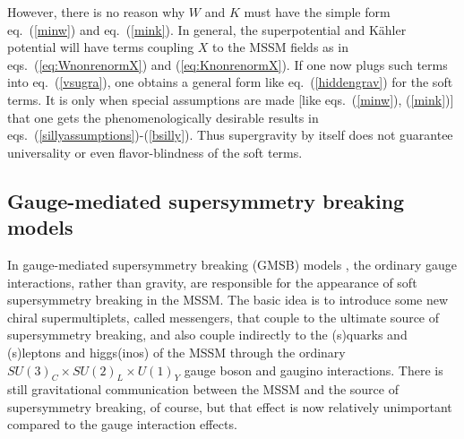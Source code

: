 \documentclass[12pt]{article}
\begin{document}
However, there is no  reason why $W$ and $K$ must have the 
simple form eq.~(\ref{minw}) and eq.~(\ref{mink}). In general, the 
superpotential and K\"ahler potential will have terms coupling $X$ to the MSSM 
fields as in eqs.~(\ref{eq:WnonrenormX}) and (\ref{eq:KnonrenormX}).
If one now plugs such terms into eq.~(\ref{vsugra}), one obtains a
general form like eq.~(\ref{hiddengrav}) for the soft terms. It is only
when special assumptions are made [like eqs.~(\ref{minw}), (\ref{mink})]
that one gets the phenomenologically desirable results in
eqs.~(\ref{sillyassumptions})-(\ref{bsilly}). Thus
supergravity by itself does not guarantee universality or 
even flavor-blindness of the soft
terms. 


\subsection{Gauge-mediated supersymmetry breaking
models}\label{subsec:origins.gmsb}
\setcounter{equation}{0}
\setcounter{footnote}{1}

In gauge-mediated supersymmetry breaking (GMSB) models
\cite{oldgmsb,newgmsb}, the ordinary gauge interactions, rather than
gravity, are responsible for the appearance of soft supersymmetry breaking
in the MSSM.  The basic idea is to introduce some new chiral
supermultiplets, called messengers, that couple to the ultimate source of
supersymmetry breaking, and also couple indirectly to the (s)quarks and
(s)leptons and higgs(inos) of the MSSM through the ordinary $SU(3)_C\times
SU(2)_L\times U(1)_Y$ gauge boson and gaugino interactions.  There is
still gravitational communication between the MSSM and the source of
supersymmetry breaking, of course, but that effect is now relatively
unimportant compared to the gauge interaction effects. 
\end{document}

